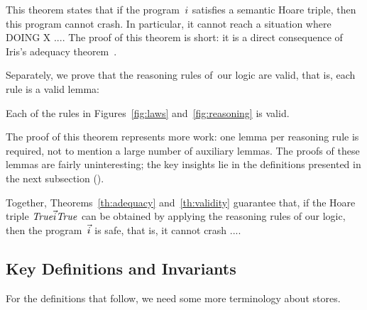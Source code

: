 This theorem states that if the program~$i$ satisfies a semantic Hoare
triple, then this program cannot crash. In
particular, it cannot reach a situation where DOING X ....
%
The proof of this theorem is short: it is a direct consequence of Iris's
adequacy theorem~\cite[\S6.4]{iris}.

Separately, we prove that the reasoning rules of~our logic are valid, that is,
each rule is a valid lemma:

\begin{theorem}
\label{th:validity}
  Each of the rules in Figures~\ref{fig:laws}
  and~\ref{fig:reasoning} is valid.
\end{theorem}

The proof of this theorem represents more work: one lemma per reasoning rule
is required, not to mention a large number of auxiliary lemmas. The proofs of
these lemmas are fairly uninteresting; the key insights lie in the definitions
presented in the next subsection ().

Together, Theorems~\ref{th:adequacy} and~\ref{th:validity} guarantee that, if
the Hoare triple $\mathit{True}\vec{i}\mathit{True}$ can be obtained by applying
the reasoning rules of our logic, then the program~$\vec{i}$ is safe, that is, it cannot crash ....

\subsection{Key Definitions and Invariants}
\label{sec:invariant}

For the definitions that follow, we need some more terminology about stores.

